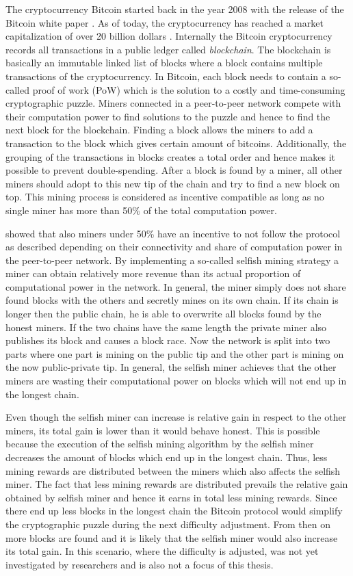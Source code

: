 The cryptocurrency Bitcoin started back in the year 2008 with the release of the Bitcoin white paper \cite{nakamoto2008bitcoin}.
As of today, the cryptocurrency has reached a market capitalization of over 20 billion dollars \cite{marketcap2017}.
Internally the Bitcoin cryptocurrency records all transactions in a public ledger called \emph{blockchain}.
The blockchain is basically an immutable linked list of blocks where a block contains multiple transactions of the cryptocurrency.
In Bitcoin, each block needs to contain a so-called proof of work (PoW) which is the solution to a costly and time-consuming cryptographic puzzle.
Miners connected in a peer-to-peer network compete with their computation power to find solutions to the puzzle and hence to find the next block for the blockchain.
Finding a block allows the miners to add a transaction to the block which gives certain amount of bitcoins.
Additionally, the grouping of the transactions in blocks creates a total order and hence makes it possible to prevent double-spending.
After a block is found by a miner, all other miners should adopt to this new tip of the chain and try to find a new block on top.
This mining process is considered as incentive compatible as long as no single miner has more than 50\% of the total computation power.

\cite{eyal2014majority} showed that also miners under 50\% have an incentive to not follow the protocol as described depending on their connectivity and share of computation power in the peer-to-peer network.
By implementing a so-called selfish mining strategy a miner can obtain relatively more revenue than its actual proportion of computational power in the network.
In general, the miner simply does not share found blocks with the others and secretly mines on its own chain.
If its chain is longer then the public chain, he is able to overwrite all blocks found by the honest miners.
If the two chains have the same length the private miner also publishes its block and causes a block race.
Now the network is split into two parts where one part is mining on the public tip and the other part is mining on the now public-private tip.
In general, the selfish miner achieves that the other miners are wasting their computational power on blocks which will not end up in the longest chain.

Even though the selfish miner can increase is relative gain in respect to the other miners, its total gain is lower than it would behave honest.
This is possible because the execution of the selfish mining algorithm by the selfish miner decreases the amount of blocks which end up in the longest chain.
Thus, less mining rewards are distributed between the miners which also affects the selfish miner.
The fact that less mining rewards are distributed prevails the relative gain obtained by selfish miner and hence it earns in total less mining rewards.
Since there end up less blocks in the longest chain the Bitcoin protocol would simplify the  cryptographic puzzle during the next difficulty adjustment.
From then on more blocks are found and it is likely that the selfish miner would also increase its total gain.
In this scenario, where the difficulty is adjusted, was not yet investigated by researchers and is also not a focus of this thesis.

